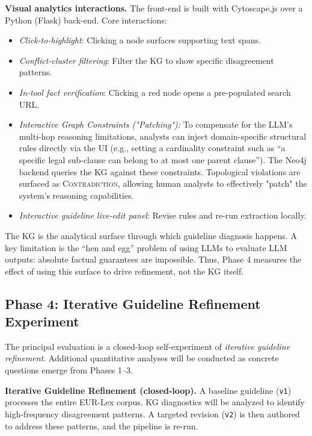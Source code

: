 \documentclass[11pt]{article}
\begin{document}
\textbf{Visual analytics interactions.} The front-end is built with Cytoscape.js over a Python (Flask) back-end. Core interactions:
\begin{itemize}[leftmargin=1.5em, itemsep=2pt]
    \item \textit{Click-to-highlight}: Clicking a node surfaces supporting text spans.
    \item \textit{Conflict-cluster filtering}: Filter the KG to show specific disagreement patterns.
    \item \textit{In-tool fact verification}: Clicking a red node opens a pre-populated search URL.
    \item \textit{Interactive Graph Constraints ("Patching"):} To compensate for the LLM's multi-hop reasoning limitations, analysts can inject domain-specific structural rules directly via the UI (e.g., setting a cardinality constraint such as ``a specific legal sub-clause can belong to at most one parent clause''). The Neo4j backend queries the KG against these constraints. Topological violations are surfaced as \textsc{Contradiction}, allowing human analysts to effectively "patch" the system's reasoning capabilities.
    \item \textit{Interactive guideline live-edit panel}: Revise rules and re-run extraction locally.
\end{itemize}

The KG is the analytical surface through which guideline diagnosis happens.
A key limitation is the ``hen and egg'' problem of using LLMs to evaluate LLM outputs: absolute factual guarantees are impossible.
Thus, Phase 4 measures the effect of using this surface to drive refinement, not the KG itself.

\subsection*{Phase 4: Iterative Guideline Refinement Experiment}

The principal evaluation is a closed-loop self-experiment of
\textit{iterative guideline refinement}.
Additional quantitative analyses
will be conducted as concrete questions emerge from Phases 1--3.

\textbf{Iterative Guideline Refinement (closed-loop).} A baseline guideline (\texttt{v1}) processes the entire EUR-Lex corpus.
KG diagnostics will be analyzed to identify high-frequency disagreement patterns.
A targeted revision (\texttt{v2}) is then authored to address these patterns, and the pipeline is re-run.
\end{document}
